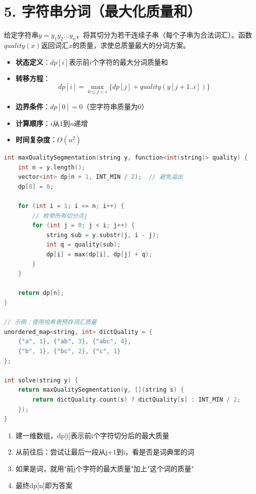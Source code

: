 \section*{5. 字符串分词（最大化质量和）}

给定字符串$y = y_1y_2\ldots y_n$，将其切分为若干连续子串（每个子串为合法词汇）。函数$quality(x)$返回词汇$x$的质量，求使总质量最大的分词方案。

\begin{itemize}
    \item \textbf{状态定义}：$dp[i]$表示前$i$个字符的最大分词质量和
    \item \textbf{转移方程}：$$dp[i] = \max_{0 \le j < i} \{dp[j] + quality(y[j+1..i])\}$$
    \item \textbf{边界条件}：$dp[0] = 0$（空字符串质量为0）
    \item \textbf{计算顺序}：$i$从$1$到$n$递增
    \item \textbf{时间复杂度}：$O(n^2)$
\end{itemize}

\begin{lstlisting}[language=C++, style=cppstyle]
int maxQualitySegmentation(string y, function<int(string)> quality) {
    int n = y.length();
    vector<int> dp(n + 1, INT_MIN / 2);  // 避免溢出
    dp[0] = 0;

    for (int i = 1; i <= n; i++) {
        // 枚举所有切分点j
        for (int j = 0; j < i; j++) {
            string sub = y.substr(j, i - j);
            int q = quality(sub);
            dp[i] = max(dp[i], dp[j] + q);
        }
    }

    return dp[n];
}

// 示例：使用哈希表预存词汇质量
unordered_map<string, int> dictQuality = {
    {"a", 1}, {"ab", 3}, {"abc", 4},
    {"b", 1}, {"bc", 2}, {"c", 1}
};

int solve(string y) {
    return maxQualitySegmentation(y, [](string s) {
        return dictQuality.count(s) ? dictQuality[s] : INT_MIN / 2;
    });
}
\end{lstlisting}

\begin{enumerate}
    \item 建一维数组，dp[i]表示前i个字符切分后的最大质量
    \item 从前往后：尝试让最后一段从j+1到i，看是否是词典里的词
    \item 如果是词，就用"前j个字符的最大质量"加上"这个词的质量"
    \item 最终dp[n]即为答案
\end{enumerate}
